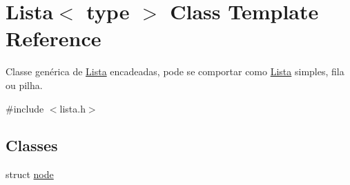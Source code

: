\hypertarget{classLista}{}\section{Lista$<$ type $>$ Class Template Reference}
\label{classLista}


Classe genérica de \hyperlink{classLista}{Lista} encadeadas, pode se comportar como \hyperlink{classLista}{Lista} simples, fila ou pilha.  




{\ttfamily \#include $<$lista.\+h$>$}

\subsection*{Classes}
\begin{DoxyCompactItemize}
\item 
struct \hyperlink{structLista_1_1node}{node}
\end{DoxyCompactItemize}
